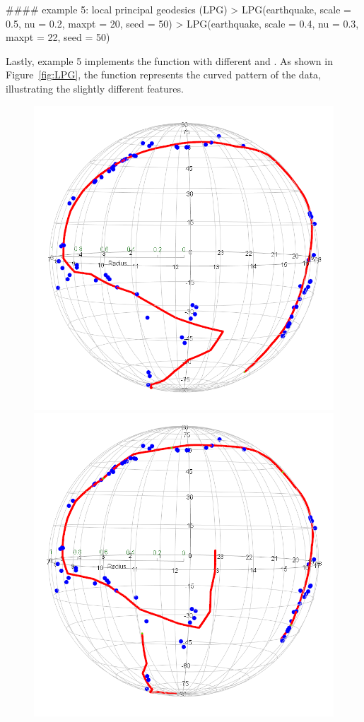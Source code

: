 \begin{example}
   #### example 5: local principal geodesics (LPG)
   > LPG(earthquake, scale = 0.5, nu = 0.2, maxpt = 20, seed = 50)
   > LPG(earthquake, scale = 0.4, nu = 0.3, maxpt = 22, seed = 50)  
\end{example}
Lastly, example 5 implements the  function with different  and . As shown in Figure~\ref{fig:LPG}, the function represents the curved pattern of the data, illustrating the slightly different features.

\begin{figure}[!h]
    \centering
    \includegraphics[scale=0.25]{figures/LPG(earthquake).png}
    \hspace{1cm}
    \includegraphics[scale=0.25]{figures/LPG(earthquake)2.png}

\end{figure}
